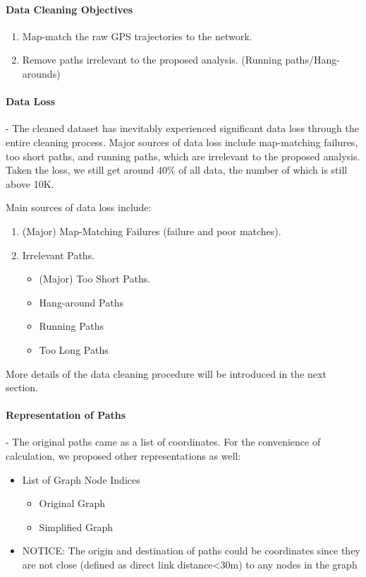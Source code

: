 \documentclass{article}
\begin{document}
\paragraph{Data Cleaning Objectives} 
\begin{enumerate}
  \item Map-match the raw GPS trajectories to the network. 
  \item Remove paths irrelevant to the proposed analysis. (Running paths/Hang-arounds)
\end{enumerate}

\paragraph{Data Loss} - The cleaned dataset has inevitably experienced significant data loss through the entire cleaning process. Major sources of data loss include map-matching failures, too short paths, and running paths, which are irrelevant to the proposed analysis. Taken the loss, we still get around 40\% of all data, the number of which is still above 10K. 

Main sources of data loss include:
\begin{enumerate}
  \item (Major) Map-Matching Failures (failure and poor matches).
  \item Irrelevant Paths. 
        \begin{itemize}
            \item (Major) Too Short Paths. 
            \item Hang-around Paths
            \item Running Paths
            \item Too Long Paths
        \end{itemize}
\end{enumerate}

More details of the data cleaning procedure will be introduced in the next section.

\paragraph{Representation of Paths} - The original paths came as a list of coordinates. For the convenience of calculation, we proposed other representations as well:
\begin{itemize}
    \item List of Graph Node Indices
        \begin{itemize}
            \item Original Graph
            \item Simplified Graph
        \end{itemize}
    \item NOTICE: The origin and destination of paths could be coordinates since they are not close (defined as direct link distance<30m) to any nodes in the graph
\end{itemize}
\end{document}
